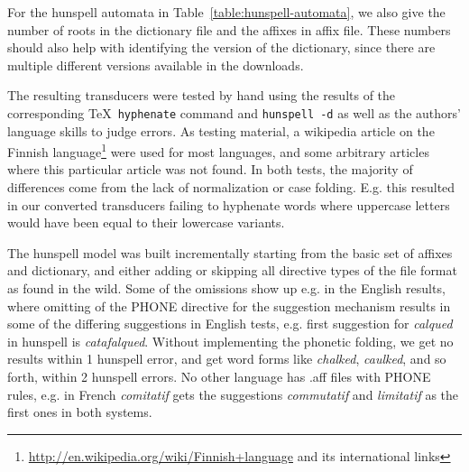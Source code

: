 \documentclass[postprint]{flammie}
\begin{document}
For the hunspell automata in Table~\ref{table:hunspell-automata}, we also give the
number of roots in the dictionary file and the affixes in affix file. These numbers
should also help with identifying the version of the dictionary, since there are multiple
different versions available in the downloads.

The resulting transducers were tested by hand using the results of the
corresponding \TeX\ \texttt{hyphenate} command and \texttt{hunspell -d} as well
as the authors' language skills to judge errors. As testing material, a wikipedia
article on the Finnish
language\footnote{\url{http://en.wikipedia.org/wiki/Finnish+language} and its
international links} were used for most languages, and some arbitrary articles
where this particular article was not found. In both tests, the majority of differences come from
the lack of normalization or case folding. E.g. this resulted in our converted
transducers failing to hyphenate words where uppercase letters would have been equal to
their lowercase variants. 

The hunspell model was built incrementally
starting from the basic set of affixes and dictionary, and either adding or
skipping all directive types of the file format as found in the wild. Some of
the omissions show up e.g. in the English results, where omitting of the PHONE
directive for the suggestion mechanism results in some of the differing suggestions
in English tests, e.g.  first suggestion for  \emph{calqued} in
hunspell is \emph{catafalqued}. Without implementing the phonetic folding,
we get no results within 1 hunspell error, and get word forms like \emph{chalked},
\emph{caulked}, and so forth, within 2 hunspell errors. No other language has .aff
files with PHONE rules, e.g. in French \emph{comitatif} gets the suggestions \emph{commutatif} and
\emph{limitatif} as the first ones in both systems. 
\end{document}
